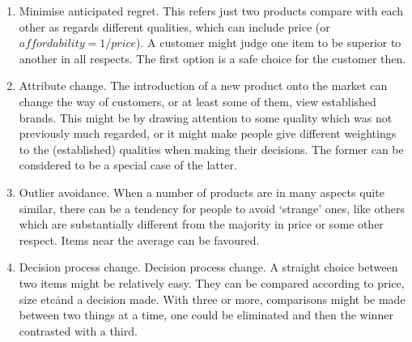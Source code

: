 \begin{enumerate}
	\item Minimise anticipated regret.
	This refers just two products compare with each other as regards different qualities, which can include price (or $affordability = 1/price$).
	A customer might judge one item to be superior to another in all respects. The first option is a safe choice for the customer then.
	\item Attribute change.
	The introduction of a new product onto the market can change the way of customers, or at least some of them, view established brands.
	This might be by drawing attention to some quality which was not previously much regarded, or it might make people give different
	weightings to the (established) qualities when making their decisions. The former can be considered to be a special case of the latter.
	\item Outlier avoidance.
	When a number of products are in many aspects quite similar, there can be a tendency for people to avoid ‘strange’ ones,
	like others which are substantially different from the majority in price or some other respect.
	Items near the average can be favoured.
	\item Decision process change.
	Decision process change.
	A straight choice between two items might be relatively easy.
	They can be compared according to price, size etc\. and a decision made. With three or more,
	comparisons might be made between two things at a time, one could be eliminated and then the winner contrasted with a third.
\end{enumerate}

